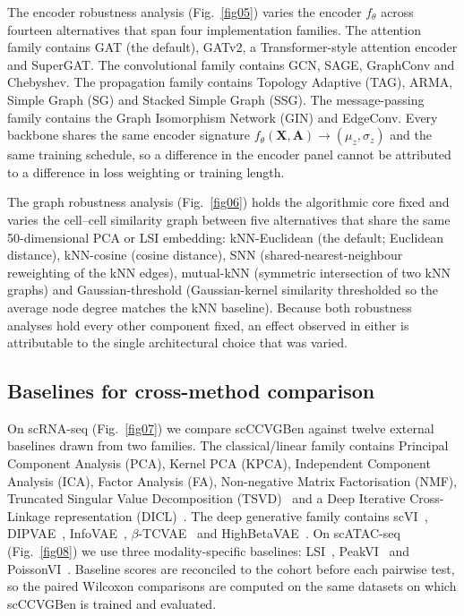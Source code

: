\documentclass[referee, pdflatex, sn-vancouver-num]{sn-jnl}
\begin{document}
The encoder robustness analysis (Fig.~\ref{fig05}) varies the encoder $f_\theta$ across fourteen alternatives that span four implementation families. The attention family contains GAT (the default), GATv2, a Transformer-style attention encoder and SuperGAT. The convolutional family contains GCN, SAGE, GraphConv and Chebyshev. The propagation family contains Topology Adaptive (TAG), ARMA, Simple Graph (SG) and Stacked Simple Graph (SSG). The message-passing family contains the Graph Isomorphism Network (GIN) and EdgeConv. Every backbone shares the same encoder signature $f_\theta(\mathbf{X},\mathbf{A})\rightarrow(\mu_z,\sigma_z)$ and the same training schedule, so a difference in the encoder panel cannot be attributed to a difference in loss weighting or training length.

The graph robustness analysis (Fig.~\ref{fig06}) holds the algorithmic core fixed and varies the cell--cell similarity graph between five alternatives that share the same 50-dimensional PCA or LSI embedding: kNN-Euclidean (the default; Euclidean distance), kNN-cosine (cosine distance), SNN (shared-nearest-neighbour reweighting of the kNN edges), mutual-kNN (symmetric intersection of two kNN graphs) and Gaussian-threshold (Gaussian-kernel similarity thresholded so the average node degree matches the kNN baseline). Because both robustness analyses hold every other component fixed, an effect observed in either is attributable to the single architectural choice that was varied.

\subsection{Baselines for cross-method comparison}\label{sec:comparators}

On scRNA-seq (Fig.~\ref{fig07}) we compare scCCVGBen against twelve external baselines drawn from two families. The classical/linear family contains Principal Component Analysis (PCA), Kernel PCA (KPCA), Independent Component Analysis (ICA), Factor Analysis (FA), Non-negative Matrix Factorisation (NMF), Truncated Singular Value Decomposition (TSVD)~\cite{halko2011finding} and a Deep Iterative Cross-Linkage representation (DICL)~\cite{wang2018dicl}. The deep generative family contains scVI~\cite{lopez2018deep}, DIPVAE~\cite{kumar2018dipvae,kim2018disentangling}, InfoVAE~\cite{zhao2019infovae,xu2021deep}, $\beta$-TCVAE~\cite{chen2018isolating} and HighBetaVAE~\cite{higgins2017betavae}. On scATAC-seq (Fig.~\ref{fig08}) we use three modality-specific baselines: LSI~\cite{stuart2021atac}, PeakVI~\cite{ashuach2022peakvi} and PoissonVI~\cite{martens2024poissonvi}. Baseline scores are reconciled to the cohort before each pairwise test, so the paired Wilcoxon comparisons are computed on the same datasets on which scCCVGBen is trained and evaluated.
\end{document}
